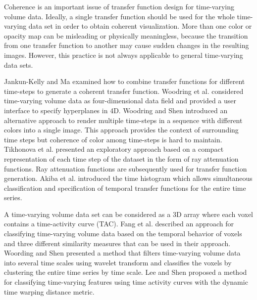 Coherence is an important issue of transfer function design for time-varying volume data. Ideally, a single transfer function should be used for the whole time-varying data set in order to obtain coherent visualization. More than one color or opacity map can be misleading or physically meaningless, because the transition from one transfer function to another may cause sudden changes in the resulting images. However, this practice is not always applicable to general time-varying data sets.

Jankun-Kelly and Ma \cite{jankun-kelly_study_2001} examined how to combine transfer functions for different time-steps to generate a coherent transfer function.
Woodring et al. \cite{woodring_high_2003} considered time-varying volume data as four-dimensional data field and provided a user interface to specify hyperplanes in 4D.
Woodring and Shen \cite{woodring_chronovolumes_2003} introduced an alternative approach to render multiple time-steps in a sequence with different colors into a single image. This approach provides the context of surrounding time steps but coherence of color among time-steps is hard to maintain.
Tikhonova et al. \cite{tikhonova_exploratory_2010} presented an exploratory approach based on a compact representation of each time step of the dataset in the form of ray attenuation functions. Ray attenuation functions are subsequently used for transfer function generation.
Akiba et al. \cite{akiba_simultaneous_2006} introduced the time histogram which allows simultaneous classification and specification of temporal transfer functions for the entire time series.

A time-varying volume data set can be considered as a 3D array where each voxel contains a time-activity curve (TAC). Fang et al. \cite{fang_visualization_2007} described an approach for classifying time-varying volume data based on the temporal behavior of voxels and three different similarity measures that can be used in their approach.
Woording and Shen \cite{woodring_multiscale_2009} presented a method that filters time-varying volume data into several time scales using wavelet transform and classifies the voxels by clustering the entire time series by time scale.
Lee and Shen \cite{lee_visualizing_2009} proposed a method for classifying time-varying features using time activity curves with the dynamic time warping distance metric.

